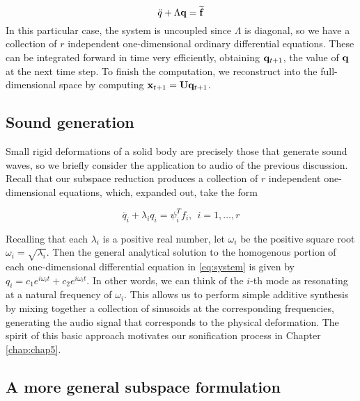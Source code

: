 \begin{equation}
\ddot{q} + \Lambda \mathbf{q} = \widetilde{\mathbf{f}}
\end{equation}
In this particular case, the system is uncoupled since $\Lambda$ is diagonal, so we have a collection of $r$ independent one-dimensional ordinary differential equations. These can be integrated forward in time very efficiently, obtaining $\mathbf{q}_{t+1}$, the value of $\mathbf{q}$ at the next time step. To finish the computation, we reconstruct into the full-dimensional space by computing $\mathbf{x}_{t+1} = \mathbf{U} \mathbf{q}_{t+1}$.

\subsection{Sound generation}
Small rigid deformations of a solid body are precisely those that generate sound waves, so we briefly consider the application to audio of the previous discussion. Recall that our subspace reduction produces a collection of $r$ independent one-dimensional equations, which, expanded out, take the form

\begin{equation}
\label{eq:system}
\ddot{q_i} + \lambda_i q_i = \psi_i^{T} f_i, \ \ i = 1, \dots, r
\end{equation}

Recalling that each $\lambda_i$ is a positive real number, let $\omega_i$ be the positive square root $\omega_i = \sqrt{\lambda_i}$. Then the general analytical solution to the homogenous portion of each one-dimensional differential equation in \ref{eq:system} is given by $q_i = c_1 e^{i \omega_i t} + c_2 e^{i \omega_i t}$. In other words, we can think of the $i$-th mode as resonating at a natural frequency of $\omega_i$. This allows us to perform simple additive synthesis by mixing together a collection of sinusoids at the corresponding frequencies, generating the audio signal that corresponds to the physical deformation. The spirit of this basic approach motivates
our sonification process in Chapter \ref{chap:chap5}.

\subsection{A more general subspace formulation}
